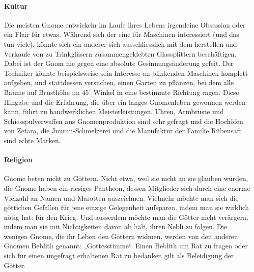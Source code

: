 \documentclass[10pt,twoside,twocolumn,openany]{book}
\begin{document}
\begin{multicols}{2}
\paragraph{Kultur}
Die meisten Gnome entwickeln im Laufe ihres Lebens irgendeine Obsession oder ein Flair für etwas. Während sich der eine für Maschinen interessiert (und das tun viele), könnte sich ein anderer sich ausschliesslich mit dem herstellen und Verkaufe von zu Trinkgläsern zusammengeklebten Glassplittern beschäftigen. Dabei ist der Gnom nie gegen eine absolute Gesinnungsänderung gefeit. Der Techniker könnte beispielsweise sein Interesse an blinkenden Maschinen komplett aufgeben, und stattdessen versuchen, einen Garten zu pflanzen, bei dem alle Bäume auf Brusthöhe im $45^{\circ}$ Winkel in eine bestimmte Richtung ragen. Diese Hingabe und die Erfahrung, die über ein langes Gnomenleben gewonnen werden kann,  führt zu handwerklichen Meisterleistungen. Uhren, Armbrüste und Schiesspulverwaffen aus Gnomenproduktion sind sehr gefragt und die  Hochöfen von Zetara, die Juuran-Schmelzerei und die Manufaktur der Familie Rübensaft sind echte Marken.
	
		
	
\paragraph{Religion}
Gnome beten nicht zu Göttern. Nicht etwa, weil sie nicht an sie glauben würden, die Gnome haben ein riesiges Pantheon, dessen Mitglieder sich durch eine enorme Vielzahl an Namen und Marotten auszeichnen.  Vielmehr möchte man sich die göttichen Gefallen für jene einzige Gelegenheit aufsparen, indem man sie wirklich nötig hat: für den Krieg. Und ausserdem möchte man die Götter nicht verärgern, indem man sie mit Nichtigkeiten davon ab hält, ihren Nebli zu folgen. Die wenigen Gnome, die ihr Leben den Göttern widmen,  werden von den anderen Gnomen Beblith genannt: „Gottesstimme“.  Einen Beblith um Rat zu fragen oder sich für einen ungefragt erhaltenen Rat zu bedanken gilt als Beleidigung der Götter.
	

\end{multicols}
\end{document}
